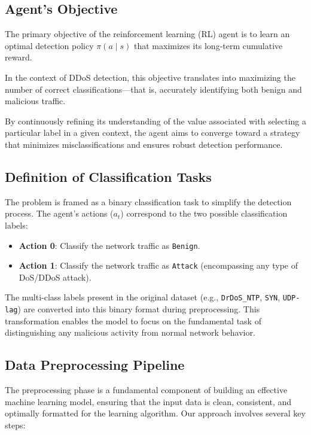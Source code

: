 \documentclass[12pt]{report}
\begin{document}
\subsection{Agent's Objective}

The primary objective of the reinforcement learning (RL) agent is to learn an optimal detection policy $\pi(a \mid s)$ that maximizes its long-term cumulative reward. 

In the context of DDoS detection, this objective translates into maximizing the number of correct classifications—that is, accurately identifying both benign and malicious traffic. 

By continuously refining its understanding of the value associated with selecting a particular label in a given context, the agent aims to converge toward a strategy that minimizes misclassifications and ensures robust detection performance.

\subsection{Definition of Classification Tasks}

The problem is framed as a binary classification task to simplify the detection process. The agent's actions ($a_t$) correspond to the two possible classification labels:

\begin{itemize}
  \item \textbf{Action 0}: Classify the network traffic as \texttt{Benign}.
  \item \textbf{Action 1}: Classify the network traffic as \texttt{Attack} (encompassing any type of DoS/DDoS attack).
\end{itemize}

The multi-class labels present in the original dataset (e.g., \texttt{DrDoS\_NTP}, \texttt{SYN}, \texttt{UDP-lag}) are converted into this binary format during preprocessing. This transformation enables the model to focus on the fundamental task of distinguishing any malicious activity from normal network behavior.


\subsection{Data Preprocessing Pipeline}

The preprocessing phase is a fundamental component of building an effective machine learning model, ensuring that the input data is clean, consistent, and optimally formatted for the learning algorithm. Our approach involves several key steps:
\end{document}
